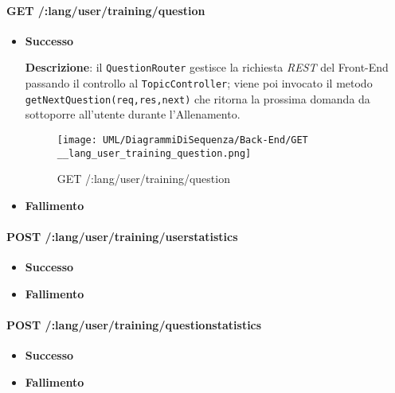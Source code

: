 \paragraph{GET /:lang/user/training/question} %
\begin{itemize}
\item \textbf{Successo}

\textbf{Descrizione}: il \texttt{QuestionRouter} gestisce la richiesta \textit{REST} del Front-End passando il controllo al \texttt{TopicController}; viene poi invocato il metodo \texttt{getNextQuestion(req,res,next)} che ritorna la prossima domanda da sottoporre all'utente durante l'Allenamento. 

\begin{figure}[ht]
	\centering
	\texttt{[image: UML/DiagrammiDiSequenza/Back-End/GET \_\_lang\_user\_training\_question.png]}
	\caption{GET /:lang/user/training/question}
\end{figure}
\FloatBarrier

\item \textbf{Fallimento}
\end{itemize}

\paragraph{POST /:lang/user/training/userstatistics} %
\begin{itemize}
\item \textbf{Successo}
\item \textbf{Fallimento}
\end{itemize}

\paragraph{POST /:lang/user/training/questionstatistics} %
\begin{itemize}
\item \textbf{Successo}
\item \textbf{Fallimento}
\end{itemize}  